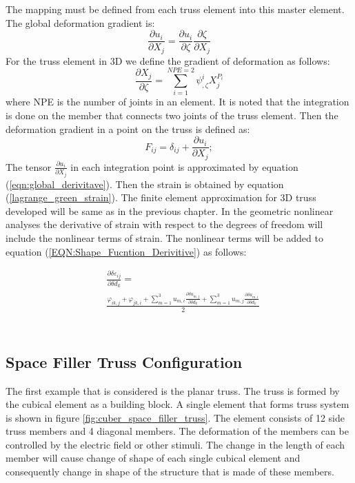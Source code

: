 The mapping must be defined from each truss element into this master element.
The global deformation gradient is:
\begin{equation}
\frac{\partial u_i}{\partial X_j}=\frac{\partial u_i}{\partial \zeta}
\frac{\partial \zeta}{\partial X_j}
\label{eqn:global_derivitave} 
\end{equation}
For the truss element in 3D we define the gradient of deformation as follows:
\begin{equation}
\frac{\partial X_j }{\partial \zeta}= 
  \sum_{i=1}^{NPE=2} \psi^i_{,\zeta} X^{P_i}_j 
\label{eqn:delXi_delzeta} 
\end{equation}
where NPE is the number of joints in an element.
It is noted that the integration is done on the member that connects two joints of the truss element.
Then the deformation gradient in a point on the truss is defined as:
\begin{equation}
F_{ij}=\delta_{ij}+ \frac{\partial u_i}{\partial X_j};  
\end{equation}
The tensor $\frac{\partial u_i}{\partial X_j}$ in each integration point is approximated by equation (\ref{eqn:global_derivitave}).
Then the strain is obtained by equation (\ref{lagrange_green_strain}).
The finite element approximation for 3D truss developed will be same as in the previous chapter.
In the geometric nonlinear analyses the derivative of strain with respect to the degrees of freedom will include the nonlinear terms of strain.
The nonlinear terms will be added to equation (\ref{EQN:Shape_Fucntion_Derivitive}) as follows:

\begin{equation}
\begin{aligned}
&\frac{\partial \delta \varepsilon_{ij}}{\partial \delta d_k} =\\
&\frac{\varphi_{ik,j}+\varphi_{jk,i} + \sum_{m=1}^3 u_{m,i} \frac{\partial \delta u_{m,j}}{\partial \delta d_k} +
\sum_{m=1}^3 u_{m,j} \frac{\partial \delta u_{m,i}}{\partial \delta d_k}}{2} \\
\end{aligned}
\label{EQN:non_linear_shape_Fucntion_Derivitive}
\end{equation}
\\


\subsection{Space Filler Truss Configuration}
The first example that is considered is the planar truss.
The truss is formed by the cubical element as a building block. 
A single element that forms truss system is shown in figure \ref{fig:cuber_space_filler_truss}.
The element consists of 12 side truss members and 4 diagonal members.
The deformation of the members can be controlled by the electric field or other stimuli.
The change in the length of each member will cause change of shape of each single cubical element and consequently change in shape of the structure that is made of these members.

